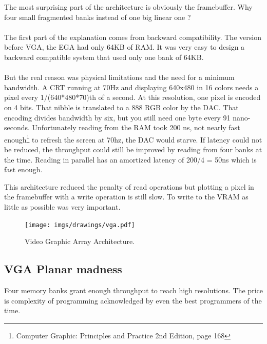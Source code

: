 \documentclass[book.tex]{subfiles}
\begin{document}
The most surprising part of the architecture is obviously the framebuffer. Why four small fragmented banks instead of one big linear one ?\\
\\
The first part of the explanation comes from backward compatibility. The version before VGA, the EGA had only 64KB of RAM. It was very easy to design a backward compatible system that used only one bank of 64KB.\\
\\
But the real reason was physical limitations and the need for a minimum bandwidth. A CRT running at 70Hz and displaying 640x480 in 16 colors needs a pixel every 1/(640*480*70)th of a second. At this resolution, one pixel is encoded on 4 bits. That nibble is translated to a 888 RGB color by the DAC. That encoding divides bandwidth by six, but you still need one byte every 91 nano-seconds. Unfortunately reading from the RAM took 200 ns,  not nearly fast enough\footnote{Computer Graphic: Principles and Practice 2nd Edition, page 168} to refresh the screen at 70hz, the DAC would starve. If latency could not be reduced, the throughput could still be improved by reading from four banks at the time. Reading in parallel has an amortized latency of 200/4 = 50ns which is fast enough.\\
\par
This architecture reduced the penalty of read operations but plotting a pixel in the framebuffer with a write operation is still slow. To write to the VRAM as little as possible was very important.


\begin{figure}[H]
\centering
\texttt{[image: imgs/drawings/vga.pdf]}
\caption{Video Graphic Array Architecture.}
\label{fig:vga_arch}
\end{figure}




\subsection{VGA Planar madness}

Four memory banks grant enough throughput to reach high resolutions. The price is complexity of programming acknowledged by even the best programmers of the time.\\
\end{document}
